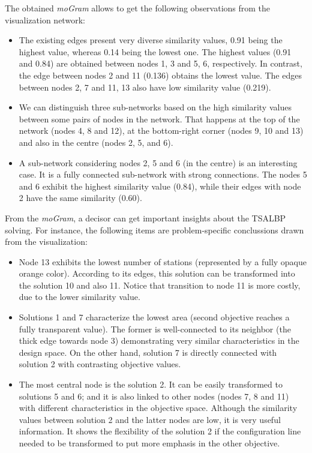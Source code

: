 \documentclass[journal]{IEEEtran}
\begin{document}
The obtained \emph{moGram} allows to get the following observations from the visualization network:
\begin{itemize}
\item The existing edges present very diverse similarity values, 0.91 being the highest value, whereas 0.14 being the lowest one. The highest values (0.91 and 0.84) are obtained between nodes 1, 3 and 5, 6, respectively. In contrast, the edge between nodes 2 and 11 (0.136) obtains the lowest value. The edges between nodes 2, 7 and 11, 13 also have low similarity value (0.219).
 \item We can distinguish three sub-networks based on the high similarity values between some pairs of nodes in the network. That happens at the top of the network (nodes 4, 8 and 12), at the bottom-right corner (nodes 9, 10 and 13) and also in the centre (nodes 2, 5, and 6). 
 \item A sub-network considering nodes 2, 5 and 6 (in the centre) is an interesting case. It is a fully connected sub-network with strong connections. The nodes 5 and 6 exhibit the highest similarity value (0.84), while their edges with node 2 have the same similarity (0.60).
\end{itemize}

From the \emph{moGram}, a decisor can get important insights about the TSALBP solving. For instance, the following items are problem-specific conclussions drawn from the visualization:

\begin{itemize}
 \item Node 13 exhibits the lowest number of stations (represented by a fully opaque orange color). According to its edges, this solution can be transformed into the solution 10 and also 11. Notice that transition to node 11 is more costly, due to the lower similarity value. 
 
 \item Solutions 1 and 7 characterize the lowest area (second objective reaches a fully transparent value). The former is well-connected to its neighbor (the thick edge towards node 3) demonstrating very similar characteristics in the design space. On the other hand, solution 7 is directly connected with solution 2 with contrasting objective values. 

 \item The most central node is the solution 2. It can be easily transformed to solutions 5 and 6; and it is also linked to other nodes (nodes 7, 8 and 11) with different characteristics in the objective space. Although the similarity values between solution 2 and the latter nodes are low, it is very useful information. It shows the flexibility of the solution 2 if the configuration line needed to be transformed to put more emphasis in the other objective.
\end{itemize}
\end{document}

